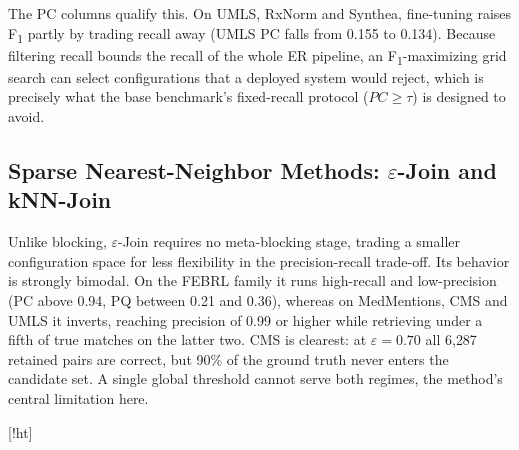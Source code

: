 \documentclass[runningheads]{llncs}
\makeatletter
\renewenvironment{table}
  {\setlength\abovecaptionskip{0\p@}%
   \setlength\belowcaptionskip{7\p@}%
   \@float{table}}
  {\end@float}
\makeatother
\begin{document}
The PC columns qualify this. On UMLS, RxNorm and Synthea, fine-tuning raises
F\textsubscript{1} partly by trading recall away (UMLS PC falls from 0.155 to 0.134). Because filtering recall bounds the recall of the whole ER pipeline, an F\textsubscript{1}-maximizing grid search can select configurations that a deployed system would reject, which is precisely what the base benchmark's fixed-recall protocol ($PC \geq \tau$) is designed to avoid.

\subsection{Sparse Nearest-Neighbor Methods: $\varepsilon$-Join and kNN-Join}
\label{sec:results-sparse}

Unlike blocking, $\varepsilon$-Join requires no meta-blocking stage, trading a smaller
configuration space for less flexibility in the precision-recall trade-off. Its behavior is
strongly bimodal. On the FEBRL family it runs high-recall and low-precision (PC above 0.94,
PQ between 0.21 and 0.36), whereas on MedMentions, CMS and UMLS it inverts, reaching precision
of 0.99 or higher while retrieving under a fifth of true matches on the latter two. CMS is
clearest: at $\varepsilon = 0.70$ all 6{,}287 retained pairs are correct, but 90\% of the
ground truth never enters the candidate set. A single global threshold cannot serve both
regimes, the method's central limitation here.

\begin{table}[!ht]
\centering
\caption{$\varepsilon$-Join on medical datasets, with per-dataset configuration.}
\label{tab:eps-join-config}
\end{table}
\end{document}
